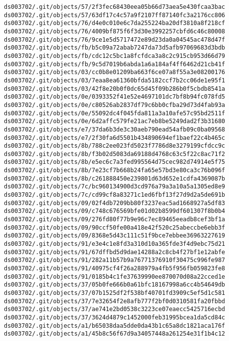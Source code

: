 \documentclass[11pt]{article}
\begin{document}
\begin{Verbatim}[commandchars=\\\{\}]
ds003702/.git/objects/57/2f3fec68430eea05b66d73aea5e430fcaa3bac
ds003702/.git/objects/57/63df17c4c57a9f2107ff87140fc3a2176cc806
ds003702/.git/objects/76/d4e0c010e6c7da255224ba20df3810a8f218cf
ds003702/.git/objects/76/4009bf875f6f3d30e3992257cbfd6c46c80008
ds003702/.git/objects/76/9ce1e5d5717472e89d23da0a04545ac478d47f
ds003702/.git/objects/fb/b5c09a72abab7247da73d5afb97069683d3bdb
ds003702/.git/objects/fb/cdc12c5bc1a8fcfdca3a8c2c915cb953d66d79
ds003702/.git/objects/fb/9c5d7019b6abda1a6a184af4ff6462d21cb41f
ds003702/.git/objects/03/cc0b8e01209ba663f6ce07a8f55a3e08200176
ds003702/.git/objects/03/7eaa8ea61360bfda5182ccf7b2cc06de1e95f1
ds003702/.git/objects/03/42f8e20b0f0dc65d45f09b286b0f5cbdb8541a
ds003702/.git/objects/0e/0393352f41e52e4697101dc7bf8b94fc078fd5
ds003702/.git/objects/0e/c80526ab2837df79c6bb0cfba29d73d4fab93a
ds003702/.git/objects/0e/55092dc4f045fda811a3a10afe57c95bd2511f
ds003702/.git/objects/0e/6d2affc579fe21ac7eb8be5249dad2f3b31680
ds003702/.git/objects/e7/37da6b3de3c30aeb790ead54afb09c0ba09568
ds003702/.git/objects/e7/2f30fa6d5501b434890694ef1baef22c4b465c
ds003702/.git/objects/8b/788c2ee023fd5023f7786d8e3279199cfdcc9c
ds003702/.git/objects/8b/f3b02d5083da69188d4768c63c5f22c8ac71f2
ds003702/.git/objects/8b/e5ec6c7a3fed995564d75cec982d74914e5f75
ds003702/.git/objects/8b/7e23cf7b668b24fa65e57bd3e80ca3c76b096f
ds003702/.git/objects/8b/c261888450e239801d63d652e1cdfa4369087b
ds003702/.git/objects/7c/bc960134900d3cd976a79a3a10a5a1305ed8e9
ds003702/.git/objects/7c/cd99cf8a83271c1ed6fbf13f27d9d2a5de691b
ds003702/.git/objects/09/02f4db7209bb80f3237eac5ad1668927a5df83
ds003702/.git/objects/09/c748c676569bfe01d02b8599df601307f8b0b4
ds003702/.git/objects/09/276fd80f77b9e96c7ec89465eeadb8cef3bf1a
ds003702/.git/objects/09/90ccf50fe00a418e42f520c25abeccbe6ebb3f
ds003702/.git/objects/09/8368e5d43c111c51f9bce7ebbee36963227619
ds003702/.git/objects/91/e3e4c1e8fd3a310d10a365fde3f4d9ebc75d21
ds003702/.git/objects/91/67dffbd5d9dae14288a2c8cb4f27bf1e12abfe
ds003702/.git/objects/91/282a11b57b9a76771376910f30475c996fe987
ds003702/.git/objects/91/40975cf4f26a288979a4fb5f956fb059823fe8
ds003702/.git/objects/91/0185b4c1fe37639990ee870070d08a22cced1e
ds003702/.git/objects/37/05b0fe666b0a61bfc18167998a6cc4b54649db
ds003702/.git/objects/37/07b1525df2f538bf40701fd3909c5ef5d1c581
ds003702/.git/objects/37/7e32654f2e8afb777f2bf0d0310581fa20fbbd
ds003702/.git/objects/37/ae741e2bd0538c3223ce07eaecc5425716ecbd
ds003702/.git/objects/37/3624d4879c1452000feb31995bcea1da5cd84c
ds003702/.git/objects/a1/b65038daa5dde0da43b1c65a8dc1821aca176f
ds003702/.git/objects/a1/45b8c56f67d9a34057448a261254e31f1b4c12

\end{Verbatim}
\end{document}
